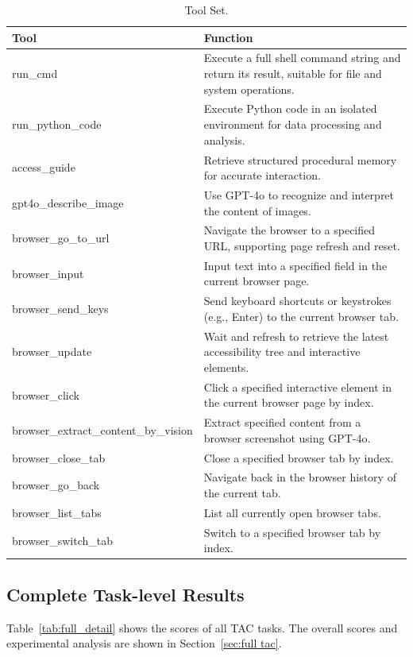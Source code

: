 \begin{table}[htbp]
\centering
\small
\caption{Tool Set.}
\vspace{5pt}
\label{tab:tool_set}
\begin{tabular}{l|p{8cm}}
\toprule
\textbf{Tool} & \textbf{Function} \\
\midrule

run\_cmd & Execute a full shell command string and return its result, suitable for file and system operations. \\
run\_python\_code & Execute Python code in an isolated environment for data processing and analysis. \\
access\_guide & Retrieve structured procedural memory for accurate interaction. \\
gpt4o\_describe\_image & Use GPT-4o to recognize and interpret the content of images. \\
browser\_go\_to\_url & Navigate the browser to a specified URL, supporting page refresh and reset. \\
browser\_input & Input text into a specified field in the current browser page. \\
browser\_send\_keys & Send keyboard shortcuts or keystrokes (e.g., Enter) to the current browser tab. \\
browser\_update & Wait and refresh to retrieve the latest accessibility tree and interactive elements. \\
browser\_click & Click a specified interactive element in the current browser page by index. \\
browser\_extract\_content\_by\_vision & Extract specified content from a browser screenshot using GPT-4o. \\
browser\_close\_tab & Close a specified browser tab by index. \\
browser\_go\_back & Navigate back in the browser history of the current tab. \\
browser\_list\_tabs & List all currently open browser tabs. \\
browser\_switch\_tab & Switch to a specified browser tab by index. \\
\bottomrule
\end{tabular}
\end{table}


\newpage
\subsection{Complete Task-level Results}
Table~\ref{tab:full_detail} shows the scores of all TAC tasks. The overall scores and experimental analysis are shown in Section~\ref{sec:full tac}.

